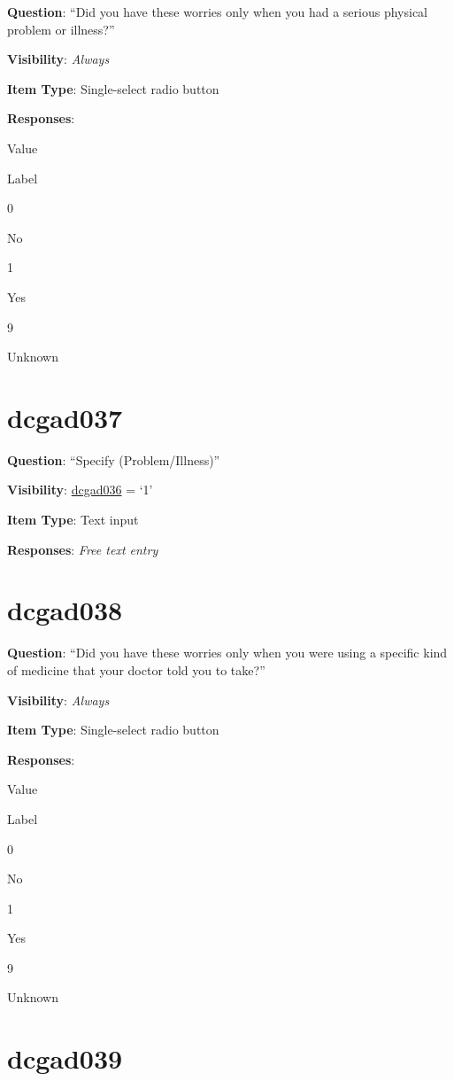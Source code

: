 \documentclass[]{book}
\begin{document}
\textbf{Question}: ``Did you have these worries only when you had a serious physical problem or illness?''

\textbf{Visibility}: \emph{Always}

\textbf{Item Type}: Single-select radio button

\textbf{Responses}:

Value

Label

0

No

1

Yes

9

Unknown

\hypertarget{dcgad037}{%
\section{dcgad037}\label{dcgad037}}

\textbf{Question}: ``Specify (Problem/Illness)''

\textbf{Visibility}: \protect\hyperlink{dcgad036}{dcgad036} = `1'

\textbf{Item Type}: Text input

\textbf{Responses}: \emph{Free text entry}

\hypertarget{dcgad038}{%
\section{dcgad038}\label{dcgad038}}

\textbf{Question}: ``Did you have these worries only when you were using a specific kind of medicine that your doctor told you to take?''

\textbf{Visibility}: \emph{Always}

\textbf{Item Type}: Single-select radio button

\textbf{Responses}:

Value

Label

0

No

1

Yes

9

Unknown

\hypertarget{dcgad039}{%
\section{dcgad039}\label{dcgad039}}
\end{document}

